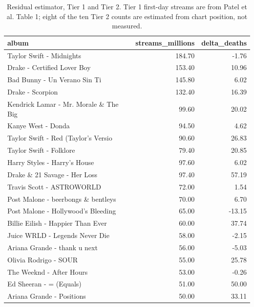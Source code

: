 \begin{table}
\caption{Residual estimator, Tier 1 and Tier 2. Tier 1 first-day streams are from Patel et al. Table 1; eight of the ten Tier 2 counts are estimated from chart position, not measured.}
\begin{tabular}{lrr}
\toprule
album & streams\_millions & delta\_deaths \\
\midrule
Taylor Swift - Midnights & 184.70 & -1.76 \\
Drake - Certified Lover Boy & 153.40 & 10.96 \\
Bad Bunny - Un Verano Sin Ti & 145.80 & 6.02 \\
Drake - Scorpion & 132.40 & 16.39 \\
Kendrick Lamar - Mr. Morale \& The Big & 99.60 & 20.02 \\
Kanye West - Donda & 94.50 & 4.62 \\
Taylor Swift - Red (Taylor's Versio & 90.60 & 26.83 \\
Taylor Swift - Folklore & 79.40 & 20.85 \\
Harry Styles - Harry's House & 97.60 & 6.02 \\
Drake \& 21 Savage - Her Loss & 97.40 & 57.19 \\
Travis Scott - ASTROWORLD & 72.00 & 1.54 \\
Post Malone - beerbongs \& bentleys & 70.00 & 6.70 \\
Post Malone - Hollywood's Bleeding & 65.00 & -13.15 \\
Billie Eilish - Happier Than Ever & 60.00 & 37.74 \\
Juice WRLD - Legends Never Die & 58.00 & -2.15 \\
Ariana Grande - thank u next & 56.00 & -5.03 \\
Olivia Rodrigo - SOUR & 55.00 & 25.78 \\
The Weeknd - After Hours & 53.00 & -0.26 \\
Ed Sheeran - = (Equals) & 51.00 & 50.00 \\
Ariana Grande - Positions & 50.00 & 33.11 \\
\bottomrule
\end{tabular}
\end{table}
